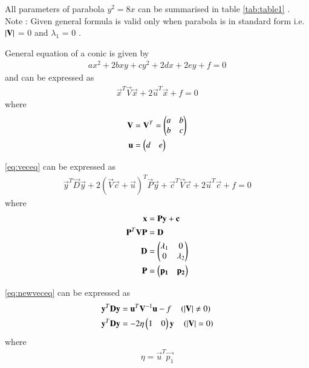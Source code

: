 \documentclass[journal,12pt,twocolumn]{IEEEtran}
\begin{document}
All parameters of parabola $y^2=8x$ can be summarised in table \ref{tab:table1} .
\\
Note : Given general formula is valid only when parabola is in standard form i.e. $\left\vert\mathbf{V}\right\vert$ = 0 and $\lambda_1$ = 0 . 


\begin{lemma}
General equation of a conic is given by
\begin{align}
ax^2+2bxy+cy^2+2dx+2ey+f=0 \label{eq:geneq}
\end{align}
and can be expressed as 
\begin{align}
    \vec{x}^T\vec{V}\vec{x} + 2\vec{u}^T\vec{x} + f = 0 \label{eq:veceq}
\end{align}
where
\begin{align}
    \mathbf{V}&=\mathbf{V}^T=\begin{pmatrix}a & b\\b & c\end{pmatrix}
    \\
    \mathbf{u}&=\begin{pmatrix}d & e\end{pmatrix}
\end{align}
\end{lemma}

\begin{lemma}
\eqref{eq:veceq} can be expressed as 
\begin{align}
    \vec{y}^T\vec{D}\vec{y} + 2(\vec{V}\vec{c} + \vec{u})^T \vec{P}\vec{y} + \vec{c}^T\vec{V}\vec{c} + 2\vec{u}^T\vec{c} + f = 0 \label{eq:newveceq}
\end{align}
where
\begin{align}
    \mathbf{x} &= \mathbf{P}\mathbf{y}+\mathbf{c} \\
    \mathbf{P}^T\mathbf{V}\mathbf{P} &= \mathbf{D} \\
    \mathbf{D} &= \begin{pmatrix}\lambda_1 & 0 \\ 0 & \lambda_2\end{pmatrix}\\
    \mathbf{P} &= \begin{pmatrix}\mathbf{p_1} & \mathbf{p_2}\end{pmatrix}
\end{align}
\end{lemma}

\begin{lemma}
\eqref{eq:newveceq} can be expressed as 
\begin{align}
 \mathbf{y}^T\mathbf{D}\mathbf{y} &= \mathbf{u}^T\mathbf{V}^{-1}\mathbf{u} - f \quad \left(\left\vert\mathbf{V}\right\vert \neq 0\right) \label{eq:stdvecneq}
 \\
\mathbf{y}^T\mathbf{D}\mathbf{y} &= -2\eta\begin{pmatrix}1 & 0\end{pmatrix}\mathbf{y} \quad \left(\left\vert\mathbf{V}\right\vert = 0\right) \label{eq:stdveceq}
\end{align} 
where
\begin{align}
    \eta = \vec{u}^T\vec{p_1}
\end{align}
\end{lemma}
\end{document}
